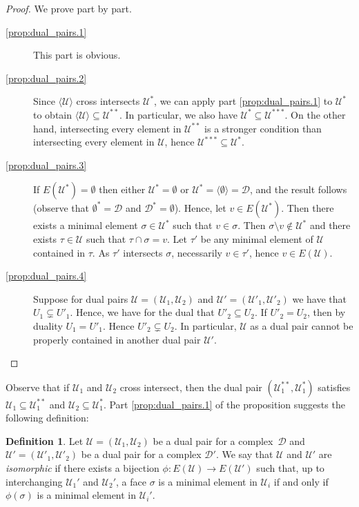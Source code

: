 \documentclass[a4paper,12pt]{amsart}
\theoremstyle{plain}
\theoremstyle{definition}
\newtheorem{definition}[theorem]{Definition}
\newcommand{\darkred}{\color{darkred}} %
\newcommand{\U}{\mathcal U}
\newcommand{\D}{\mathcal D}
\newcommand{\face}{\sigma}
\newcommand{\smallface}{\tau}
\newcommand{\defn}[1]{\emph{\darkred #1}} %
\begin{document}
\begin{proof}
We prove  part by part.

\begin{description}
  \item[\eqref{prop:dual_pairs.1}] This part is obvious.

  \item[\eqref{prop:dual_pairs.2}] Since $\langle \U\rangle$ cross intersects $\U^*$, we can apply part \eqref{prop:dual_pairs.1} to $\U^*$ to obtain $\langle \U\rangle \subseteq \U^{**}$. In particular, we also have $\U^* \subseteq \U^{***}$. On the other hand, intersecting every element in $\U^{**}$ is a stronger condition than intersecting every element in $\U$, hence $\U^{***} \subseteq \U^*$.

  \item[\eqref{prop:dual_pairs.3}] If $E(\U^*)=\emptyset$ then either $\U^*=\emptyset$ or $\U^*=\langle \emptyset\rangle = \D$, and the result follows (observe that $\emptyset^*=\D$ and $\D^*=\emptyset$). Hence, let $v\in E(\U^*)$. Then there exists a minimal element $\face \in \U^*$ such that $v\in \face$. Then $\face\setminus v \notin \U^*$ and there exists $\smallface \in \U$ such that $\smallface \cap \face = v$. Let $\smallface'$ be any minimal element of $\U$ contained in $\smallface$. As $\smallface'$ intersects $\face$, necessarily $v\in \smallface'$, hence $v\in E(\U)$.

  \item[\eqref{prop:dual_pairs.4}] Suppose for dual pairs $\U = (\U_1, \U_2)$ and $\U' = (\U'_1, \U'_2)$ we have that $U_1 \subsetneq U'_1$. Hence, we have for the dual that $U'_2 \subseteq U_2$. If $U'_2 = U_2$, then by duality $U_1 = U'_1$. Hence $U'_2 \subsetneq U_2$. In particular, $\U$ as a dual pair cannot be properly contained in another dual pair $\U'$. \qedhere
\end{description}
\end{proof}

Observe that if $\U_1$ and $\U_2$ cross intersect, then the dual pair $(\U_1^{**}, \U_1^* )$ satisfies $\U_1\subseteq \U_1^{**}$ and $\U_2\subseteq \U_1^*$.
Part \eqref{prop:dual_pairs.1} of the proposition suggests the following definition:

\begin{definition}
  Let $\U= (\U_1,\U_2)$ be a dual pair for a complex~$\D$ and $\U'=(\U'_1,\U'_2)$ be a dual pair for a complex $\D'$. We say that $\U$ and $\U'$ are \defn{isomorphic} if there exists a bijection $\phi:E(\U)\to E(\U')$ such that, up to interchanging $\U_1'$ and $\U_2'$, a face $\face$ is a minimal element in $\U_i$ if and only if $\phi(\face)$ is a minimal element in $\U_i'$.
\end{definition}
\end{document}
